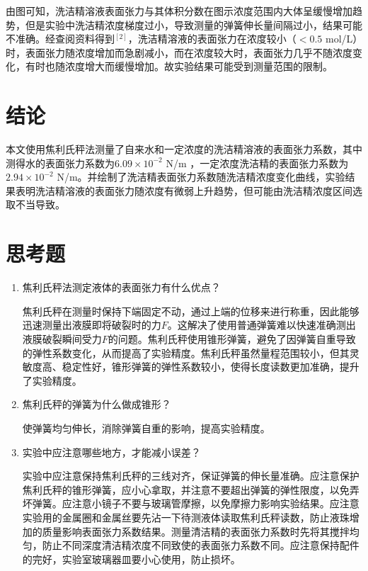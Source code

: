 \documentclass[a4paper]{extarticle}
\begin{document}
    \hspace{2em}
    由图可知，洗洁精溶液表面张力与其体积分数在图示浓度范围内大体呈缓慢增加趋势，但是实验中洗洁精浓度梯度过小，导致测量的弹簧伸长量间隔过小，结果可能不准确。经查阅资料得到$^{[2]}$，洗洁精溶液的表面张力在浓度较小（$<0.5$ mol/L）时，表面张力随浓度增加而急剧减小，而在浓度较大时，表面张力几乎不随浓度变化，有时也随浓度增大而缓慢增加。故实验结果可能受到测量范围的限制。
    \section{结论}
    \hspace{2em}
    本文使用焦利氏秤法测量了自来水和一定浓度的洗洁精溶液的表面张力系数，其中测得水的表面张力系数为$6.09\times10^{-2}$ N/m ，一定浓度洗洁精的表面张力系数为$2.94\times10^{-2}$ N/m。并绘制了洗洁精表面张力系数随洗洁精浓度变化曲线，实验结果表明洗洁精溶液的表面张力随浓度有微弱上升趋势，但可能由洗洁精浓度区间选取不当导致。
    \section{思考题}
    \begin{enumerate}
        \item 焦利氏秤法测定液体的表面张力有什么优点？
        \par\hspace{2em}
        焦利氏秤在测量时保持下端固定不动，通过上端的位移来进行称重，因此能够迅速测量出液膜即将破裂时的力$F$。这解决了使用普通弹簧难以快速准确测出液膜破裂瞬间受力$F$的问题。焦利氏秤使用锥形弹簧，避免了因弹簧自重导致的弹性系数变化，从而提高了实验精度。焦利氏秤虽然量程范围较小，但其灵敏度高、稳定性好，锥形弹簧的弹性系数较小，使得长度读数更加准确，提升了实验精度。
        \item 焦利氏秤的弹簧为什么做成锥形？
        \par\hspace{2em}
        使弹簧均匀伸长，消除弹簧自重的影响，提高实验精度。
        \item 实验中应注意哪些地方，才能减小误差？
        \par\hspace{2em}
        实验中应注意保持焦利氏秤的三线对齐，保证弹簧的伸长量准确。应注意保护焦利氏秤的锥形弹簧，应小心拿取，并注意不要超出弹簧的弹性限度，以免弄坏弹簧。应注意小镜子不要与玻璃管摩擦，以免摩擦力影响实验结果。应注意实验用的金属圈和金属丝要先沾一下待测液体读取焦利氏秤读数，防止液珠增加的质量影响表面张力系数结果。测量清洁精的表面张力系数时先将其搅拌均匀，防止不同深度清洁精浓度不同致使的表面张力系数不同。应注意保持配件的完好，实验室玻璃器皿要小心使用，防止损坏。
    \end{enumerate}
\end{document}
